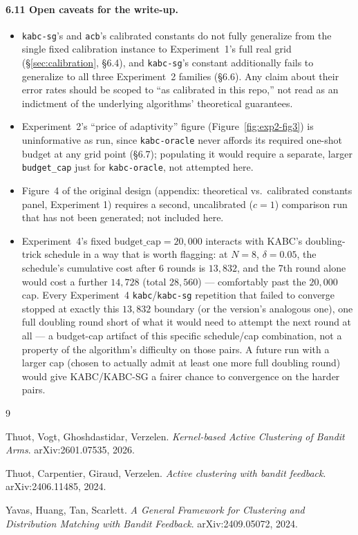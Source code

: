 \documentclass[11pt]{article}
\begin{document}
\paragraph{6.11 Open caveats for the write-up.}
\begin{itemize}
  \item \texttt{kabc-sg}'s and \texttt{acb}'s calibrated constants do not fully
    generalize from the single fixed calibration instance to Experiment~1's
    full real grid (\S\ref{sec:calibration}, \S6.4), and \texttt{kabc-sg}'s
    constant additionally fails to generalize to all three Experiment~2
    families (\S6.6). Any claim about their error rates should be scoped to
    ``as calibrated in this repo,'' not read as an indictment of the
    underlying algorithms' theoretical guarantees.
  \item Experiment~2's ``price of adaptivity'' figure
    (Figure~\ref{fig:exp2-fig3}) is uninformative as run, since
    \texttt{kabc-oracle} never affords its required one-shot budget at any
    grid point (\S6.7); populating it would require a separate, larger
    \texttt{budget\_cap} just for \texttt{kabc-oracle}, not attempted here.
  \item Figure~4 of the original design (appendix: theoretical vs.\ calibrated
    constants panel, Experiment 1) requires a second, uncalibrated ($c=1$)
    comparison run that has not been generated; not included here.
  \item Experiment~4's fixed $\text{budget\_cap}=20{,}000$ interacts with
    KABC's doubling-trick schedule in a way that is worth flagging: at
    $N=8$, $\delta=0.05$, the schedule's cumulative cost after 6 rounds is
    $13{,}832$, and the 7th round alone would cost a further $14{,}728$
    (total $28{,}560$) --- comfortably past the $20{,}000$ cap. Every
    Experiment~4 \texttt{kabc}/\texttt{kabc-sg} repetition that failed to
    converge stopped at exactly this $13{,}832$ boundary (or the version's
    analogous one), one full doubling round short of what it would need to
    attempt the next round at all --- a budget-cap artifact of this specific
    schedule/cap combination, not a property of the algorithm's difficulty
    on those pairs. A future run with a larger cap (chosen to actually admit
    at least one more full doubling round) would give KABC/KABC-SG a fairer
    chance to convergence on the harder pairs.
\end{itemize}

\begin{thebibliography}{9}

Thuot, Vogt, Ghoshdastidar, Verzelen.
\textit{Kernel-based Active Clustering of Bandit Arms}.
arXiv:2601.07535, 2026.

Thuot, Carpentier, Giraud, Verzelen.
\textit{Active clustering with bandit feedback}.
arXiv:2406.11485, 2024.

Yavas, Huang, Tan, Scarlett.
\textit{A General Framework for Clustering and Distribution Matching with Bandit Feedback}.
arXiv:2409.05072, 2024.

\end{thebibliography}
\end{document}
